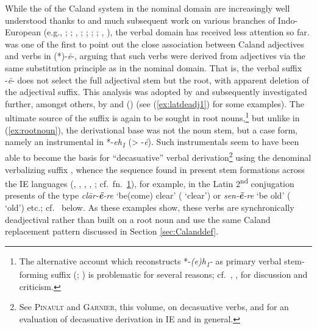 \documentclass[output=paper,colorlinks,citecolor=brown]{langscibook}
\begin{document}
While the  of the Caland system  in the nominal domain are increasingly well understood thanks to \citet{Nussbaum1976} and much subsequent work on various branches of Indo-European (e.g., \citealt{Meiser1993}; \citealt{Nussbaum1999}; \citealt{Balles2006}, \citeyear{Balles2009}; \citealt{Rau2009}; \citealt{DellOro2015}; \citealt{Bozzone2016}; \citealt{Majer2017}, \citeyear{Majer2021}), the verbal domain has received less attention so far. \citet{Watkins1971} was one of the first to point out the close association between Caland adjectives  and  verbs in (*)-\textit{ē}-, arguing that such verbs were derived from adjectives  via the same substitution principle as in the nominal domain. That is, the verbal suffix -\textit{ē}- does not select the full adjectival stem but the root, with apparent deletion of the adjectival suffix. This analysis was adopted by \citet{Nussbaum1976} and subsequently investigated further, amongst others, by \citet{Jasanoff1978} and (\citeyear{Jasanoff2004}) (see (\ref{ex:latdeadj1}) for some examples). The ultimate source of the suffix is again to be sought in root nouns,\footnote{\label{fn:eh1}The alternative account which reconstructs *-\textit{(e)h\textsubscript{1}-} as primary verbal stem-forming suffix (\citealt{Hardarson1998}; ) is problematic for several reasons; cf.\ \citealt{Jasanoff2004}, \citealt[156]{GarciaRamon2014}, \citealt[20--21]{Grestenberger2023}  for discussion and criticism.} but unlike in (\ref{ex:rootnoun}), the derivational base was not the noun stem, but a case form, namely an instrumental in *-\textit{eh\textsubscript{1}} (> -\textit{ē}). Such instrumentals seem to have been able to become the basis for ``decasuative'' verbal derivation\footnote{See \textsc{Pinault} and \textsc{Garnier}, this volume, on decasuative verbs, and \citealt{Fortson2020} for an evaluation of decasuative derivation in IE and in general.} using the denominal verbalizing  suffix , whence the sequence  found in present stem formations across the IE languages (\citealt{Watkins1971}, \citealt{Rasmussen1993}, \citealt{Hardarson1998}, \citealt{Jasanoff2004}, \citealt{Yakubovich2014}; cf.\ fn.\ \ref{fn:eh1}), for example, in the Latin 2\textsuperscript{nd} conjugation presents of the type \textit{clār-\textbf{ē}-re}  `be(come) clear' ( `clear') or \textit{sen-\textbf{ē}-re}  `be old' ( `old') etc.; cf.\  below. As these examples show, these verbs are synchronically deadjectival  rather than built on a root noun and use the same Caland replacement pattern   discussed in Section \ref{sec:Calanddef}.
\end{document}
